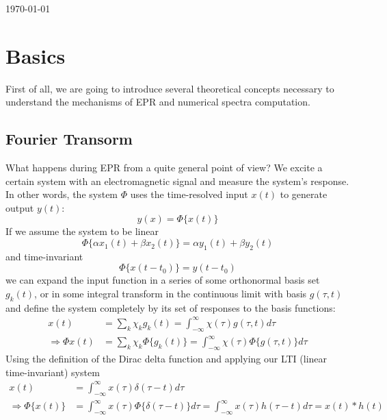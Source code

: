 \documentclass[11.5pt,a4paper]{article}
\begin{document}
\newpage
\tableofcontents

\vfill
\hfill \today 


\newpage

\section{Basics}
First of all, we are going to introduce several theoretical concepts necessary to understand the mechanisms of EPR and numerical spectra computation.

\subsection{Fourier Transorm}
What happens during EPR from a quite general point of view? We excite a certain system with an electromagnetic signal and measure the system's response. In other words, the system $\Phi$ uses the time-resolved input $x(t)$ to generate output $y(t)$:
\begin{equation}
	y(x) = \Phi\{x(t)\}
\end{equation}
If we assume the system to be linear
\begin{equation}
 	\Phi\{\alpha x_1(t) + \beta x_2(t)\} = \alpha y_1(t) + \beta y_2(t)
\end{equation}
and time-invariant
\begin{equation}
	\Phi\{x(t-t_0)\} = y(t-t_0)
\end{equation}
we can expand the input function in a series of some orthonormal basis set $g_k(t)$, or in some integral transform in the continuous limit with basis $g(\tau,t)$ and define the system completely by its set of responses to the basis functions:
\begin{align}
	x(t) & = \sum_k \chi_k g_k(t) = \int_{-\infty}^{\infty} \chi(\tau) g(\tau,t) d\tau \\
	\Rightarrow \Phi{x(t)} & = \sum_k \chi_k \Phi\{g_k(t)\} = \int_{-\infty}^{\infty} \chi(\tau) \Phi\{g(\tau,t)\} d\tau
\end{align}
Using the definition of the Dirac delta function and applying our LTI (linear time-invariant) system
\begin{align}
	x(t) & =  \int_{-\infty}^{\infty} x(\tau) \delta(\tau-t) d\tau \\
	\Rightarrow 	\Phi\{x(t)\} & =  \int_{-\infty}^{\infty} x(\tau) \Phi\{\delta(\tau-t)\} d\tau = \int_{-\infty}^{\infty} x(\tau) h(\tau-t) d\tau = x(t) * h(t)
\end{align}
\end{document}
